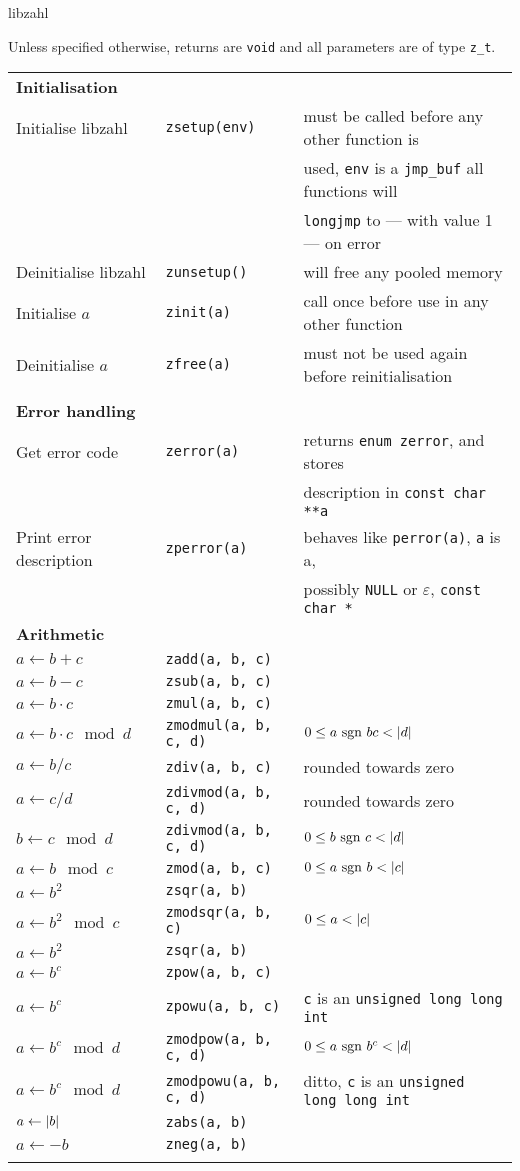 \documentclass[10pt]{article}
\DeclarePairedDelimiter\ab{\lvert}{\rvert}
\newcommand{\ullong}{{\tt unsigned long long int}}
\newcommand{\entry}[3]{ #2 & {\tt #1} & #3 \\ }
\newcommand{\cont}[1]{ & & #1 \\ }
\begin{document}
{\Huge libzahl}
\vspace{1ex}

Unless specified otherwise, returns are {\tt void} and all parameters are of type {\tt z\_t}.
\vspace{1.5em}



\hspace{-2ex}
\begin{tabular}{lll}



\textbf{Initialisation} \\
\entry{zsetup(env)} {Initialise libzahl}   {must be called before any other function is}
\cont                                      {used, {\tt env} is a {\tt jmp\_buf} all functions will}
\cont                                      {{\tt longjmp} to --- with value 1 --- on error}
\entry{zunsetup()}  {Deinitialise libzahl} {will free any pooled memory}
\entry{zinit(a)}    {Initialise $a$}       {call once before use in any other function}
\entry{zfree(a)}    {Deinitialise $a$}     {must not be used again before reinitialisation}
\\

\textbf{Error handling} \\
\entry{zerror(a)}  {Get error code}          {returns {\tt enum zerror}, and stores}
\cont                                        {description in {\tt const char **a}}
\entry{zperror(a)} {Print error description} {behaves like {\tt perror(a)}, {\tt a} is a,}
\cont                                        {possibly {\tt NULL} or $\varepsilon$, {\tt const char *}}

\textbf{Arithmetic} \\
\entry{zadd(a, b, c)}        {$a \gets b + c$}            {}
\entry{zsub(a, b, c)}        {$a \gets b - c$}            {}
\entry{zmul(a, b, c)}        {$a \gets b \cdot c$}        {}
\entry{zmodmul(a, b, c, d)}  {$a \gets b \cdot c \mod d$} {$0 \le a~\mbox{sgn}~bc < \ab{d}$}
\entry{zdiv(a, b, c)}        {$a \gets b / c$}            {rounded towards zero}
\entry{zdivmod(a, b, c, d)}  {$a \gets c / d$}            {rounded towards zero}
\entry{zdivmod(a, b, c, d)}  {$b \gets c \mod d$}         {$0 \le b~\mbox{sgn}~c < \ab{d}$}
\entry{zmod(a, b, c)}        {$a \gets b \mod c$}         {$0 \le a~\mbox{sgn}~b < \ab{c}$}
\entry{zsqr(a, b)}           {$a \gets b^2$}              {}
\entry{zmodsqr(a, b, c)}     {$a \gets b^2 \mod c$}       {$0 \le a < \ab{c}$}
\entry{zsqr(a, b)}           {$a \gets b^2$}              {}
\entry{zpow(a, b, c)}        {$a \gets b^c$}              {}
\entry{zpowu(a, b, c)}       {$a \gets b^c$}              {{\tt c} is an \ullong{}}
\entry{zmodpow(a, b, c, d)}  {$a \gets b^c \mod d$}       {$0 \le a~\mbox{sgn}~b^c < \ab{d}$}
\entry{zmodpowu(a, b, c, d)} {$a \gets b^c \mod d$}       {ditto, {\tt c} is an \ullong{}}
\entry{zabs(a, b)}           {$a \gets \ab{b}$}           {}
\entry{zneg(a, b)}           {$a \gets -b$}               {}
\\


\end{tabular}
\end{document}
